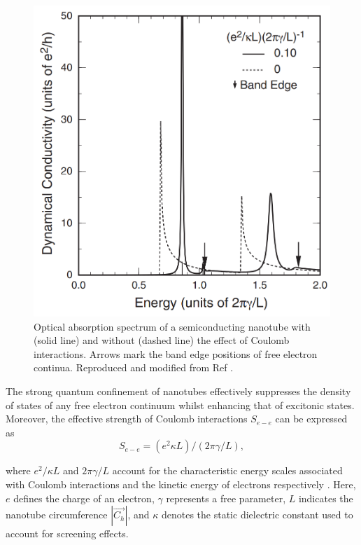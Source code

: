 \begin{figure}[h]
	\centering
	\includegraphics[scale=0.4]{images/chapter_optical_props/ando_suppression}
	\caption{Optical absorption spectrum of a semiconducting nanotube with (solid line) and without (dashed line) the effect of Coulomb interactions. Arrows mark the band edge positions of free electron continua. Reproduced and modified from Ref \cite{ando2005theory}.}
	\label{fig:ando_suppression}
\end{figure}

The strong quantum confinement of nanotubes effectively suppresses the density of states of any free electron continuum whilst enhancing that of excitonic states. Moreover, the effective strength of Coulomb interactions $S_{e-e}$ can be expressed as 
\begin{equation}
	S_{e-e} = (e^2 \kappa L)/(2 \pi \gamma/L),
\end{equation}

where $e^2 /\kappa L$ and $2 \pi \gamma / L$ account for the characteristic energy scales associated with Coulomb interactions and the kinetic energy of electrons respectively \cite{ando2005theory}. Here, $e$ defines the charge of an electron, $\gamma$ represents a free parameter, $L$ indicates the nanotube circumference $|\vec{C_h}|$, and $\kappa$ denotes the static dielectric constant used to account for screening effects.

